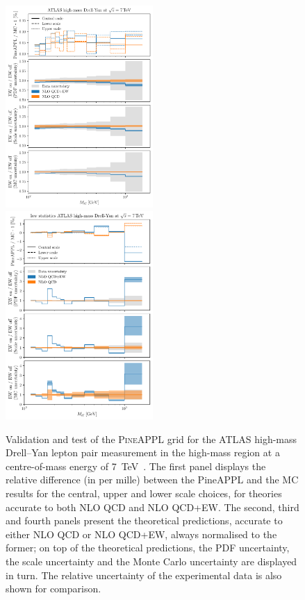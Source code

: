 \begin{figure}[!t]
    \centering
    \includegraphics[width=0.5\textwidth]{figures/pineappl_ATLASZHIGHMASS49FB}%
    \includegraphics[width=0.5\textwidth]{figures/pineappl_ATLASZHIGHMASS49FB_lowstat}
    \caption{Validation and test of the \textsc{PineAPPL} grid for the ATLAS
      high-mass Drell--Yan lepton pair measurement in the high-mass region at
      a centre-of-mass energy of \SI{7}{\tera\electronvolt}~\cite{Aad:2013iua}. The first panel
      displays the relative difference (in per mille) between the {\sc PineAPPL}
      and the MC results for the central, upper and lower scale choices,
      for theories accurate to both NLO QCD and NLO QCD+EW. The second, third
      and fourth panels present the theoretical predictions, accurate to either
      NLO QCD or NLO QCD+EW, always normalised to the former; on top of the
      theoretical predictions, the PDF uncertainty, the scale uncertainty and
      the Monte Carlo uncertainty are displayed in turn. The relative
      uncertainty of the experimental data is also shown for comparison.}
    \label{fig:atlaszhighmass49fb}
\end{figure}

